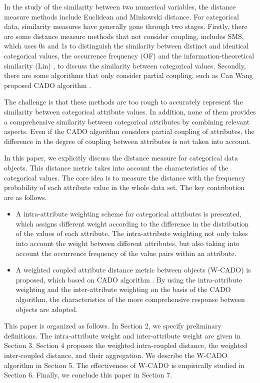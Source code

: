 \documentclass[review]{elsarticle}
\begin{document}
In the study of the similarity between two numerical variables, the distance measure methods include Euclidean and Minkowski distance. For categorical data, similarity measures have generally gone through two stages. Firstly, there are some distance measure methods that not consider coupling, includes SMS, which uses 0s and 1s to distinguish the similarity between distinct and identical categorical values, the occurrence frequency (OF) \cite{BoriahS2008Comparative} and the information-theoretical similarity (Lin) \cite{BoriahS2008Comparative}, to discuss the similarity between categorical values. Secondly, there are some algorithms that only consider partial coupling, such as Can Wang proposed CADO algorithm \cite{WangC2015CADO}.

The challenge is that these methods are too rough to accurately represent the similarity between categorical attribute values. In addition, none of them provides a comprehensive similarity between categorical attributes by combining relevant aspects. Even if the CADO algorithm considers partial coupling of attributes, the difference in the degree of coupling between attributes is not taken into account.

In this paper, we explicitly discuss the distance measure for categorical data objects. This distance metric takes into account the characteristics of the categorical values. The core idea is to measure the distance with the frequency probability of each attribute value in the whole data set. The key contribution are as follows.
\begin{itemize}
  \item A intra-attribute weighting scheme for categorical attributes is presented, which assigns different weight according to the difference in the distribution of the values of each attribute. The intra-attribute weighting not only takes into account the weight between different attributes, but also taking into account the occurrence frequency of the value pairs within an attribute.

  \item A weighted coupled attribute distance metric between objects (W-CADO) is proposed, which based on CADO algorithm \cite{WangC2015CADO}. By using the intra-attribute weighting and the inter-attribute weighting \cite{JiaH2016NewMetric} on the basis of the CADO algorithm, the characteristics of the more comprehensive response between objects are adopted.
\end{itemize}

This paper is organized as follows. In Section 2, we specify preliminary definitions. The intra-attribute weight and inter-attribute weight are given in Section 3. Section 4 proposes the weighted intra-coupled distance, the weighted inter-coupled distance, and their aggregation. We describe the W-CADO algorithm in Section 5. The effectiveness of W-CADO is empirically studied in Section 6. Finally, we conclude this paper in Section 7.
\end{document}
